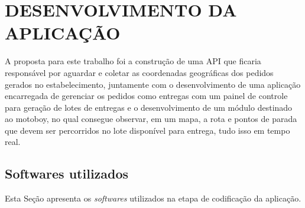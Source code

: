 
\chapter{DESENVOLVIMENTO DA APLICAÇÃO}
A proposta para este trabalho foi a construção de uma API que ficaria responsável
por aguardar e coletar as coordenadas geográficas dos pedidos gerados no estabelecimento,
juntamente com o desenvolvimento de uma aplicação encarregada de gerenciar os pedidos como entregas
com um painel de controle para geração de lotes de entregas e o desenvolvimento de um módulo destinado ao motoboy, no qual consegue observar, em um mapa, a rota e pontos de parada que devem ser percorridos no lote disponível para entrega, tudo isso em tempo real.

\section{Softwares utilizados}
Esta Seção apresenta os \textit{softwares} utilizados na etapa de codificação da aplicação.

